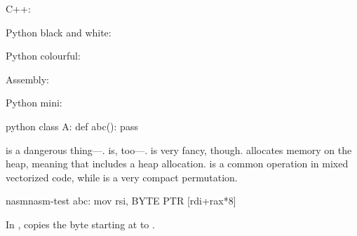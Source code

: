 \documentclass{article}
\begin{document}
C++:

Python black and white:

Python colourful:

Assembly:

Python mini:

\begin{SemCoMiniEnv}{python}
class A:
  def abc(): pass
\end{SemCoMiniEnv}

 is a dangerous thing---.
 is, too---.
 is very fancy, though.
 allocates memory on the heap, meaning that  includes a heap allocation.
 is a common operation in mixed vectorized code, while  is a very compact permutation.
\begin{SemCoAnalyzeEnv}{nasm}{nasm-test}
abc:
  mov rsi, BYTE PTR [rdi+rax*8]
\end{SemCoAnalyzeEnv}
In ,  copies the byte starting at  to .
\end{document}
